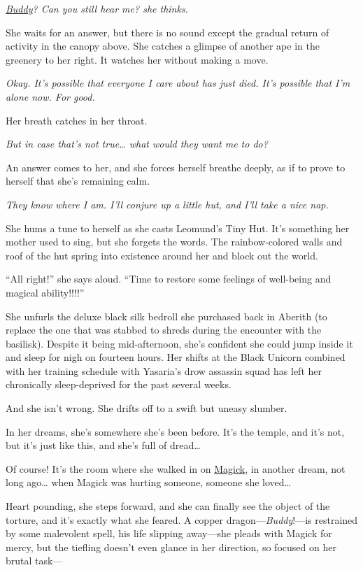 \documentclass[smalldemyvopaper,11pt,twoside,onecolumn,openright,extrafontsizes]{memoir}
\begin{document}
\emph{\href{/characters/buddy/}{Buddy}? Can you still hear me? she
thinks.}

She waits for an answer, but there is no sound except the gradual return
of activity in the canopy above. She catches a glimpse of another ape in
the greenery to her right. It watches her without making a move.

\emph{Okay. It's possible that everyone I care about has just died. It's
possible that I'm alone now. For good.}

Her breath catches in her throat.

\emph{But in case that's not true\ldots{} what would they want me to
do?}

An answer comes to her, and she forces herself breathe deeply, as if to
prove to herself that she's remaining calm.

\emph{They know where I am. I'll conjure up a little hut, and I'll take
a nice nap.}

She hums a tune to herself as she casts Leomund's Tiny Hut. It's
something her mother used to sing, but she forgets the words. The
rainbow-colored walls and roof of the hut spring into existence around
her and block out the world.

``All right!'' she says aloud. ``Time to restore some feelings of
well-being and magical ability!!!!''

She unfurls the deluxe black silk bedroll she purchased back in Aberith
(to replace the one that was stabbed to shreds during the encounter with
the basilisk). Despite it being mid-afternoon, she's confident she could
jump inside it and sleep for nigh on fourteen hours. Her shifts at the
Black Unicorn combined with her training schedule with Yasaria's drow
assassin squad has left her chronically sleep-deprived for the past
several weeks.

And she isn't wrong. She drifts off to a swift but uneasy slumber.

In her dreams, she's somewhere she's been before. It's the temple, and
it's not, but it's just like this, and she's full of dread\ldots{}

Of course! It's the room where she walked in on
\href{/characters/magick/}{Magick}, in another dream, not long
ago\ldots{} when Magick was hurting someone, someone she loved\ldots{}

Heart pounding, she steps forward, and she can finally see the object of
the torture, and it's exactly what she feared. A copper
dragon---\emph{Buddy}!---is restrained by some malevolent spell, his
life slipping away---she pleads with Magick for mercy, but the tiefling
doesn't even glance in her direction, so focused on her brutal task---
\end{document}
